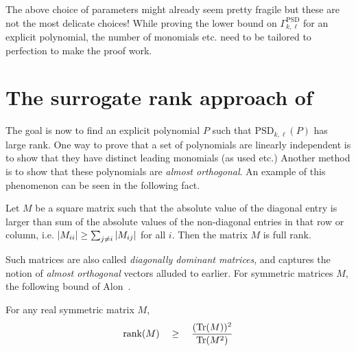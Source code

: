 The above choice of parameters might already seem pretty fragile but these are not the most delicate choices! 
While proving the lower bound on $\Gamma^{\mathrm{PSD}}_{k,\ell}$ for an explicit polynomial, the number of monomials etc. need to be tailored to perfection to make the proof work. 

\section{The surrogate rank approach of \cite{KLSS}}

The goal is now to find an explicit polynomial $P$ such that $\mathrm{PSD}_{k,\ell}(P)$ has large rank. 
One way to prove that a set of polynomials are linearly independent is to show that they have distinct leading monomials (as used \cite{gkks13} etc.) Another method is to show that these polynomials are \emph{almost orthogonal}. 
An example of this phenomenon can be seen in the following fact. 

\begin{fact}
Let $M$ be a square matrix such that the absolute value of the diagonal entry is larger than sum of the absolute values of the non-diagonal entries in that row or column, i.e. $\left|M_{ii}\right| \geq \sum_{j\neq i} \left|M_{ij}\right|$ for all $i$. 
Then the matrix $M$ is full rank. 
\end{fact}

Such matrices are also called \emph{diagonally dominant matrices}, and captures the notion of \emph{almost orthogonal} vectors alluded to earlier. 
For symmetric matrices $M$, the following bound of Alon~\cite{Alo09}.

\begin{lemma}\label{lem:trace-bound} For any real symmetric matrix $M$, 
\[
\mathrm{rank}(M) \quad \geq \quad \frac{(\mathrm{Tr}(M))^2}{\mathrm{Tr}(M^2)}
\]
\end{lemma}

